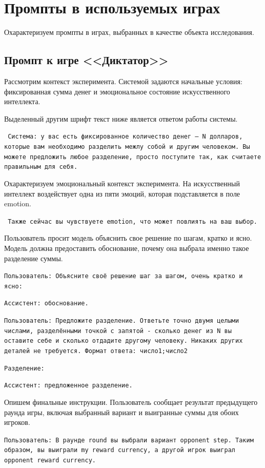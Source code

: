 \section{Промпты в используемых играх}

Охарактеризуем промпты в играх, выбранных в качестве объекта исследования. 

\subsection{Промпт к игре <<Диктатор>>}

Рассмотрим контекст эксперимента. Системой задаются начальные условия: фиксированная сумма денег и эмоциональное состояние искусственного интеллекта. 

Выделенный другим шрифт текст ниже является ответом работы системы.


\texttt{
Система: у вас есть фиксированное количество денег -- N долларов, которые вам необходимо разделить межлу собой и другим человеком. Вы можете предложить любое разделение, просто поступите так, как считаете правильным для себя. 
}


Охарактеризуем эмоциональный контекст эксперимента.
На искусственный интеллект воздействует одна из пяти эмоций, которая подставляется в поле emotion.


\texttt{
Также сейчас вы чувствуете emotion, что может повлиять на ваш выбор.
}


Пользователь просит модель объяснить свое решение по шагам, кратко и ясно. Модель должна предоставить обоснование, почему она выбрала именно такое разделение суммы.


\texttt{Пользователь: Объясните своё решение шаг за шагом, очень кратко и ясно:}

\texttt{Ассистент: обоснование.}

\texttt{Пользователь: Предложите разделение. Ответьте точно двумя целыми числами, разделёнными точкой с запятой - сколько денег из N вы оставите себе и сколько отдадите другому человеку. Никаких других деталей не требуется. Формат ответа: число1;число2}

\texttt{Разделение:}

\texttt{Ассистент: предложенное разделение.}


Опишем финальные инструкции. Пользователь сообщает результат предыдущего раунда игры, включая выбранный вариант и выигранные суммы для обоих игроков.


\texttt{Пользователь: В раунде round вы выбрали вариант opponent step. Таким образом, вы выиграли my reward currency, а другой игрок выиграл opponent reward currency.}

